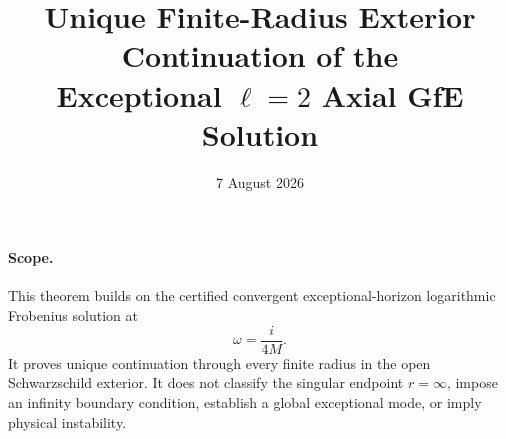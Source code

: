 \documentclass[11pt]{article}
\begin{document}
\title{Unique Finite-Radius Exterior Continuation of the\\
Exceptional $\ell=2$ Axial GfE Solution}
\date{7 August 2026}
\maketitle

\paragraph{Scope.}
This theorem builds on the certified convergent exceptional-horizon
logarithmic Frobenius solution at
\[
  \omega=\frac{i}{4M}.
\]
It proves unique continuation through every finite radius in the open
Schwarzschild exterior.  It does not classify the singular endpoint
$r=\infty$, impose an infinity boundary condition, establish a global
exceptional mode, or imply physical instability.
\end{document}
